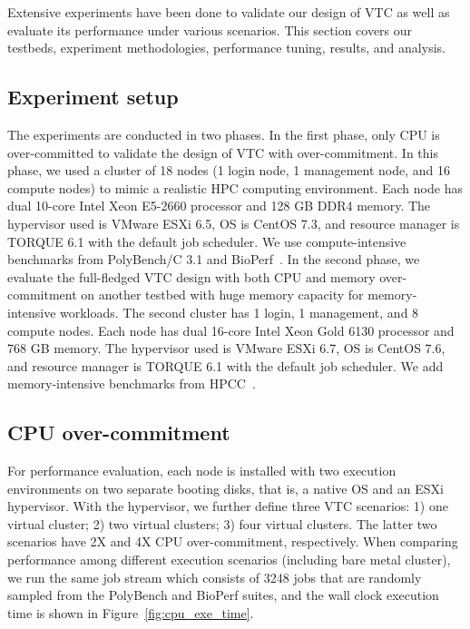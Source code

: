 Extensive experiments have been done to validate our design of VTC as well as evaluate 
its performance under various scenarios. This section covers our testbeds, experiment 
methodologies, performance tuning, results, and analysis. 

\subsection{Experiment setup}
The experiments are conducted in two phases. In the first phase, only CPU is over-committed 
to validate the design of VTC with over-commitment. In this phase, we used a cluster of 18 nodes (1 login node, 1 management node, and 16 compute nodes) to mimic a realistic HPC computing environment. Each node has dual 10-core Intel Xeon E5-2660 processor and 128 GB DDR4 memory. %
The hypervisor used is VMware ESXi 6.5, OS is CentOS 7.3, and resource manager is TORQUE 6.1 with the default job scheduler. We use compute-intensive benchmarks from PolyBench/C 3.1 and BioPerf~\cite{1526013}. 
In the second phase, we evaluate the full-fledged VTC design with both CPU and memory over-commitment on another testbed with huge memory capacity for memory-intensive workloads. The second cluster has 1 login, 1 management, and 8 compute nodes. Each node has dual 16-core Intel Xeon Gold 6130 processor and 768 GB memory. %
The hypervisor used is VMware ESXi 6.7, OS is CentOS 7.6, and resource manager is TORQUE 6.1 with the default job scheduler. We add memory-intensive benchmarks from HPCC~\cite{dongarra2004introduction}.

\subsection{CPU over-commitment}
For performance evaluation, each node is installed with two execution environments on two separate booting disks, that is, a native OS and an ESXi hypervisor. With the hypervisor, we further define three VTC scenarios: 1) one virtual cluster; 2) two virtual clusters; 3) four virtual clusters. The latter two scenarios have 2X and 4X CPU over-commitment, respectively. 
When comparing performance among different execution scenarios (including bare metal cluster), we run the same job stream which consists of 3248 jobs that are randomly sampled from the PolyBench and BioPerf suites, and the wall clock execution time is shown in Figure~\ref{fig:cpu_exe_time}.

